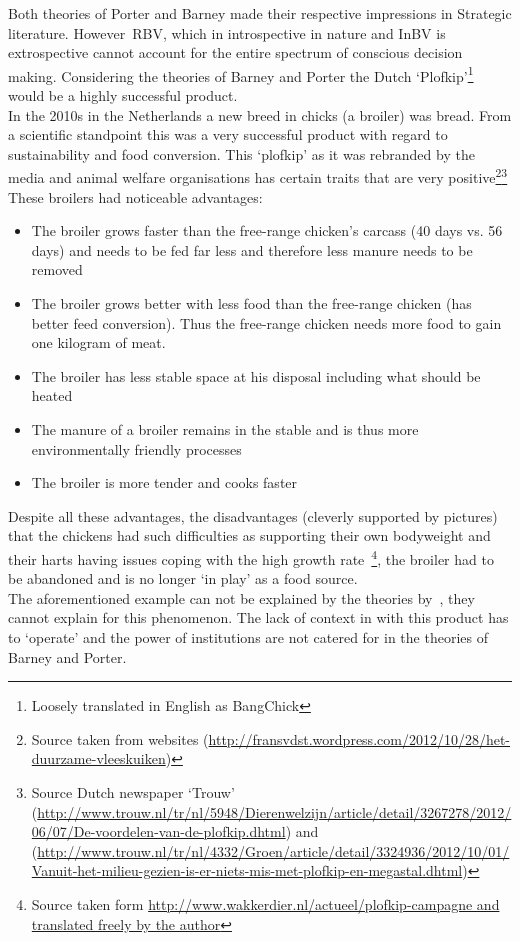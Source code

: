 



Both theories of Porter and Barney made their respective impressions in Strategic literature.  However~\gls{RBV}, which in introspective in nature and \gls{InBV} is extrospective cannot account for the entire spectrum of conscious decision making.
Considering the theories of Barney and Porter the Dutch `Plofkip'\footnote{Loosely translated in English as BangChick} would be a highly successful product.\\
In the 2010s in the Netherlands a new breed in chicks (a broiler) was bread. From a scientific standpoint this was a very successful product with regard to sustainability and food conversion. 
This `plofkip' as it was rebranded by the media and animal welfare organisations has certain traits that are very positive\footnote{Source taken from websites (\url{http://fransvdst.wordpress.com/2012/10/28/het-duurzame-vleeskuiken})}\footnote{Source Dutch newspaper `Trouw'
(\url{http://www.trouw.nl/tr/nl/5948/Dierenwelzijn/article/detail/3267278/2012/06/07/De-voordelen-van-de-plofkip.dhtml}) 
and (\url{http://www.trouw.nl/tr/nl/4332/Groen/article/detail/3324936/2012/10/01/Vanuit-het-milieu-gezien-is-er-niets-mis-met-plofkip-en-megastal.dhtml})}
These broilers had noticeable advantages:

\begin{itemize}
 \setlength{\itemsep}{0.75pt}
\item The broiler grows faster than the free-range chicken's carcass (40 days vs. 56 days) and needs to be fed far less and therefore less manure needs to be removed
 \item    The broiler grows better with less food than the free-range chicken (has better feed conversion). Thus the free-range chicken needs more food to gain one kilogram of meat.
\item     The broiler has less stable space at his disposal including what should be heated
\item     The manure of a broiler remains in the stable and is thus more environmentally friendly processes
  \item   The broiler is more tender and cooks faster
\end{itemize}
Despite all these advantages, the disadvantages (cleverly supported by pictures) that the chickens had such difficulties as supporting their own bodyweight and their harts having issues coping with the high growth rate~\footnote{Source taken form \url{http://www.wakkerdier.nl/actueel/plofkip-campagne and translated freely by the author}}, the broiler had to be abandoned and is no longer `in play' as a food source.\\
The aforementioned example can not be explained by the theories by~\cite{Porter:1980,Barney:1991}, they cannot explain for this phenomenon. 
The lack of context in with this product has to `operate'  and the power of institutions are not catered for in the theories of Barney and Porter.




